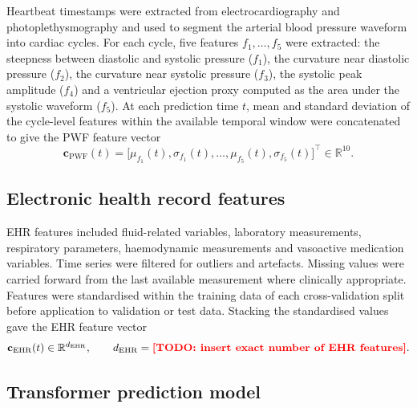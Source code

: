 \documentclass[11pt]{article}
\newcommand{\TODO}[1]{\textbf{\textcolor{red}{[TODO: #1]}}}
\begin{document}
Heartbeat timestamps were extracted from electrocardiography and photoplethysmography and used to segment the arterial blood pressure waveform into cardiac cycles. For each cycle, five features $f_{1},\ldots,f_{5}$ were extracted: the steepness between diastolic and systolic pressure ($f_{1}$), the curvature near diastolic pressure ($f_{2}$), the curvature near systolic pressure ($f_{3}$), the systolic peak amplitude ($f_{4}$) and a ventricular ejection proxy computed as the area under the systolic waveform ($f_{5}$). At each prediction time $t$, mean and standard deviation of the cycle-level features within the available temporal window were concatenated to give the PWF feature vector
\begin{equation}
  \label{eq:cPWF}
  \mathbf{c}_{\mathrm{PWF}}(t)=\bigl[\mu_{f_{1}}(t),\sigma_{f_{1}}(t),\ldots,\mu_{f_{5}}(t),\sigma_{f_{5}}(t)\bigr]^{\top}\in\mathbb{R}^{10}.
\end{equation}

\subsection*{Electronic health record features}

EHR features included fluid-related variables, laboratory measurements, respiratory parameters, haemodynamic measurements and vasoactive medication variables. Time series were filtered for outliers and artefacts. Missing values were carried forward from the last available measurement where clinically appropriate. Features were standardised within the training data of each cross-validation split before application to validation or test data. Stacking the standardised values gave the EHR feature vector
\begin{equation}
  \label{eq:cEHR}
  \mathbf{c}_{\mathrm{EHR}}(t)\in\mathbb{R}^{d_{\mathrm{EHR}}},\qquad d_{\mathrm{EHR}}=\TODO{insert exact number of EHR features}.
\end{equation}

\subsection*{Transformer prediction model}
\end{document}
